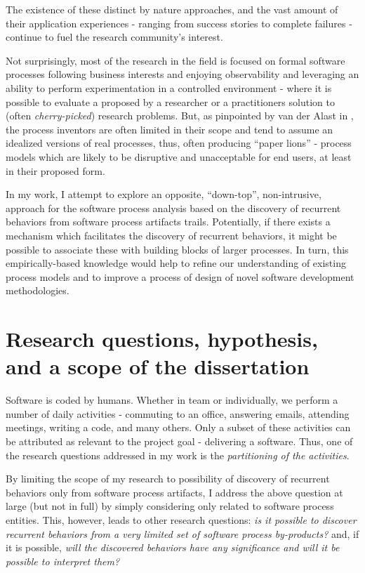 The existence of these distinct by nature approaches, and the vast amount of their application experiences -
ranging from success stories to complete failures - continue to fuel the research community's interest. 

Not surprisingly, most of the research in the field is focused on formal software processes following business 
interests and enjoying observability and leveraging an ability to perform experimentation in a controlled environment -
where it is possible to evaluate a proposed by a researcher or a practitioners solution to 
(often \textit{cherry-picked}) research problems. 
But, as pinpointed by van der Alast in \cite{citeulike:9758924}, the process inventors are often limited in their
scope and tend to assume an idealized versions of real processes, thus, often producing ``paper lions'' - 
process models which are likely to be disruptive and unacceptable for end users, at least in their proposed form.

In my work, I attempt to explore an opposite, ``down-top'', non-intrusive, approach for the software 
process analysis based on the discovery of recurrent behaviors from software process artifacts trails. 
Potentially, if there exists a mechanism which facilitates the discovery of recurrent behaviors, 
it might be possible to associate these with building blocks of larger processes. In turn, this empirically-based 
knowledge would help to refine our understanding of existing process models and to improve a process of 
design of novel software development methodologies.

\section{Research questions, hypothesis, and a scope of the dissertation}
Software is coded by humans. Whether in team or individually, we perform a number of daily activities - 
commuting to an office, answering emails, attending meetings, writing a code, and many others. 
Only a subset of these activities can be attributed as relevant to the project goal - delivering a software. 
Thus, one of the research questions addressed in my work is the \textit{partitioning of the activities}. 

By limiting the scope of my research to possibility of discovery of recurrent behaviors only from software process 
artifacts, I address the above question at large (but not in full) by simply considering only related to software process entities.
This, however, leads to other research questions: 
\textit{is it possible to discover recurrent behaviors from a very limited set of software process by-products?} 
and, if it is possible, 
\textit{will the discovered behaviors have any significance and will it be possible to interpret them?}


